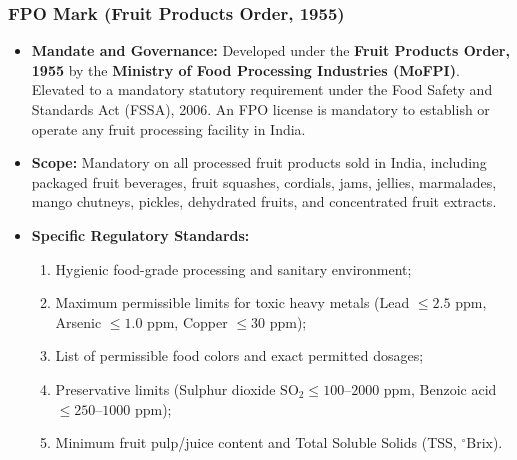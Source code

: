 \documentclass[11pt,a4paper,oneside]{article}
\begin{document}
\subsubsection{FPO Mark (Fruit Products Order, 1955)}
\begin{itemize}[leftmargin=*]
    \item \textbf{Mandate and Governance:} Developed under the \textbf{Fruit Products Order, 1955} by the \textbf{Ministry of Food Processing Industries (MoFPI)}. Elevated to a mandatory statutory requirement under the Food Safety and Standards Act (FSSA), 2006. An FPO license is mandatory to establish or operate any fruit processing facility in India.
    \item \textbf{Scope:} Mandatory on all processed fruit products sold in India, including packaged fruit beverages, fruit squashes, cordials, jams, jellies, marmalades, mango chutneys, pickles, dehydrated fruits, and concentrated fruit extracts.
    \item \textbf{Specific Regulatory Standards:}
    \begin{enumerate}[leftmargin=*]
        \item Hygienic food-grade processing and sanitary environment;
        \item Maximum permissible limits for toxic heavy metals (Lead $\le 2.5\text{ ppm}$, Arsenic $\le 1.0\text{ ppm}$, Copper $\le 30\text{ ppm}$);
        \item List of permissible food colors and exact permitted dosages;
        \item Preservative limits (Sulphur dioxide $\mathrm{SO_2} \le 100\text{--}2000\text{ ppm}$, Benzoic acid $\le 250\text{--}1000\text{ ppm}$);
        \item Minimum fruit pulp/juice content and Total Soluble Solids (TSS, ${}^\circ\text{Brix}$).
    \end{enumerate}
\end{itemize}
\end{document}
